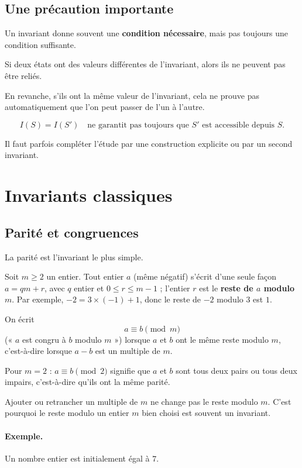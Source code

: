 \subsection{Une précaution importante}

Un invariant donne souvent une \textbf{condition nécessaire}, mais pas
toujours une condition suffisante.

Si deux états ont des valeurs différentes de l'invariant, alors ils ne peuvent
pas être reliés.

En revanche, s'ils ont la même valeur de l'invariant, cela ne prouve pas
automatiquement que l'on peut passer de l'un à l'autre.

\[
\boxed{
I(S)=I(S')
\quad\text{ne garantit pas toujours que \(S'\) est accessible depuis \(S\).}
}
\]

Il faut parfois compléter l'étude par une construction explicite ou par un
second invariant.

\section{Invariants classiques}

\subsection{Parité et congruences}

La parité est l'invariant le plus simple.

Soit \(m\geq2\) un entier. Tout entier \(a\) (même négatif) s'écrit d'une
seule façon \(a=qm+r\), avec \(q\) entier et \(0\leq r\leq m-1\) ; l'entier
\(r\) est le \textbf{reste de \(a\) modulo \(m\)}. Par exemple, \(-2=3\times(-1)+1\),
donc le reste de \(-2\) modulo \(3\) est \(1\).

On écrit
\[
a\equiv b\pmod m
\]
(« \(a\) est congru à \(b\) modulo \(m\) ») lorsque \(a\) et \(b\) ont le même
reste modulo \(m\), c'est-à-dire lorsque \(a-b\) est un multiple de \(m\).

Pour \(m=2\) : \(a\equiv b\pmod 2\) signifie que \(a\) et \(b\) sont tous deux
pairs ou tous deux impairs, c'est-à-dire qu'ils ont la même parité.

Ajouter ou retrancher un multiple de \(m\) ne change pas le reste modulo \(m\).
C'est pourquoi le reste modulo un entier \(m\) bien choisi est souvent un
invariant.

\paragraph{Exemple.}
Un nombre entier est initialement égal à \(7\).

